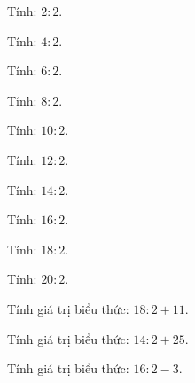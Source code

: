 \begin{ex}
Tính: $2 : 2$.
\end{ex}

\begin{ex}
Tính: $4 : 2$.
\end{ex}

\begin{ex}
Tính: $6 : 2$.
\end{ex}

\begin{ex}
Tính: $8 : 2$.
\end{ex}

\begin{ex}
Tính: $10 : 2$.
\end{ex}

\begin{ex}
Tính: $12 : 2$.
\end{ex}

\begin{ex}
Tính: $14 : 2$.
\end{ex}

\begin{ex}
Tính: $16 : 2$.
\end{ex}

\begin{ex}
Tính: $18 : 2$.
\end{ex}

\begin{ex}
Tính: $20 : 2$.
\end{ex}

\begin{ex}
Tính giá trị biểu thức: $18 : 2 + 11$.
\end{ex}

\begin{ex}
Tính giá trị biểu thức: $14 : 2 + 25$.
\end{ex}

\begin{ex}
Tính giá trị biểu thức: $16 : 2 - 3$.
\end{ex}

